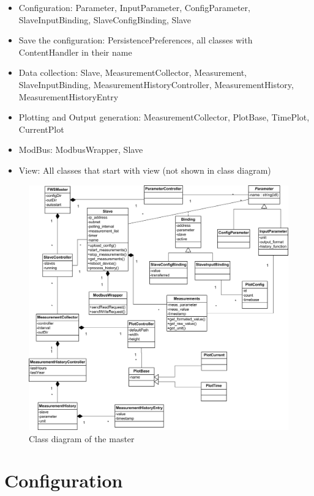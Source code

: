 \begin{itemize}
    \item Configuration: Parameter, InputParameter, ConfigParameter, SlaveInputBinding, SlaveConfigBinding, Slave
    \item Save the configuration: PersistencePreferences, all classes with ContentHandler in their name
    \item Data collection: Slave, MeasurementCollector, Measurement, SlaveInputBinding, MeasurementHistoryController, MeasurementHistory, MeasurementHistoryEntry
    \item Plotting and Output generation: MeasurementCollector, PlotBase, TimePlot, CurrentPlot
    \item ModBus: ModbusWrapper, Slave
    \item View: All classes that start with view (not shown in class diagram)
\end{itemize}

\begin{figure}[H]
    \centering
    \includegraphics[width=\linewidth]{master/class.png}
    \caption{Class diagram of the master}
    \label{fig:class_master}
\end{figure}


\section{Configuration} %
\label{sec:configuration} 

